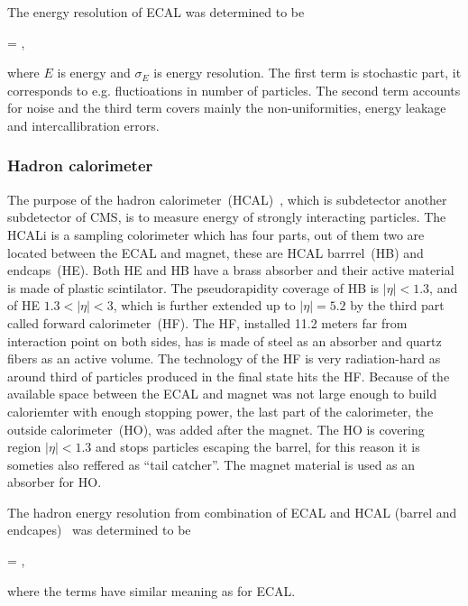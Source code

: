 The energy resolution of ECAL was determined to be

{
  =  \bigoplus {}  ,
}

where $E$ is energy and $\sigma_{E}$ is energy resolution. The first term is stochastic part, it corresponds to e.g. fluctioations in number of particles. The second term accounts for noise and the third term covers mainly the non-uniformities, energy leakage and intercallibration errors.


\subsubsection{Hadron calorimeter}

The purpose of the hadron calorimeter~(HCAL)~\cite{tdrHCAL}, which is subdetector another subdetector of CMS, is to measure energy of strongly interacting particles.  The HCALi is a sampling colorimeter which has four parts, out of them two are located between the ECAL and magnet, these are HCAL barrrel~(HB) and endcaps~(HE). Both HE and HB have a brass absorber and their active material is made of plastic scintilator. The pseudorapidity coverage of HB is $|\eta|<1.3$, and of HE $1.3<|\eta|<3$, which is further extended up to $|\eta|=5.2$ by the third part called forward calorimeter~(HF). The HF, installed 11.2 meters far from interaction point on both sides, has is made of steel as an absorber and quartz fibers as an active volume. The technology of the HF is very radiation-hard as around third of particles produced in the final state hits the HF. Because of the available space between the ECAL and magnet was not large enough to build caloriemter with enough stopping power, the last part of the calorimeter, the outside calorimeter~(HO), was added after the magnet. The HO is covering region $|\eta|<1.3$ and stops particles escaping the barrel, for this reason it is someties also reffered as ``tail catcher''. The magnet material is used as an absorber for HO.

The hadron energy resolution from combination of ECAL and HCAL (barrel and endcapes)~\cite{Chatrchyan:2009ag} was determined to be


{
  =   ,
}

where the terms have similar meaning as for ECAL.

